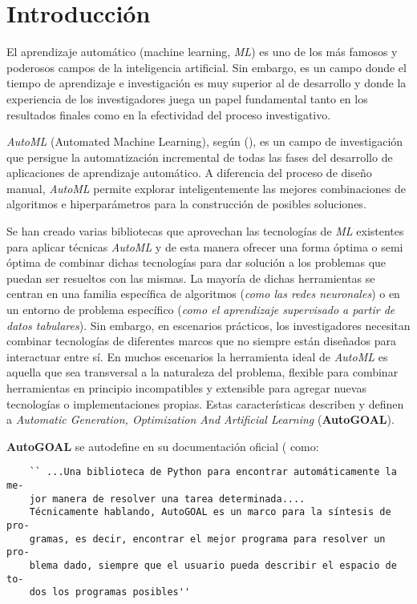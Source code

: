 \chapter*{Introducción}\label{chapter:introduction}


El aprendizaje automático (machine learning, {\it ML}) es uno de los más famosos
y poderosos campos de la inteligencia artificial. Sin embargo, es un campo
donde el tiempo de aprendizaje e investigación es muy superior al de desarrollo
y donde la experiencia de los investigadores juega un papel fundamental tanto
en los resultados finales como en la efectividad del proceso investigativo.

    {\it AutoML} (Automated Machine Learning), según (\cite{autoML}), es un campo de investigación
que persigue la automatización incremental de todas las fases del desarrollo
de aplicaciones de aprendizaje automático. A diferencia del proceso de diseño
manual, {\it AutoML} permite explorar inteligentemente las mejores combinaciones
de algoritmos e hiperparámetros para la construcción de posibles soluciones.

Se han creado varias bibliotecas que aprovechan las tecnologías de {\it ML}
existentes para aplicar técnicas {\it AutoML} y de esta manera ofrecer una forma óptima
o semi óptima de combinar dichas tecnologías para dar solución a
los problemas que puedan ser resueltos con las mismas. La mayoría de dichas
herramientas se centran en una familia específica de algoritmos ({\it como las
        redes neuronales}) o en un entorno de problema específico ({\it como el
        aprendizaje supervisado a partir de datos tabulares}). Sin embargo, en
escenarios prácticos, los investigadores necesitan combinar tecnologías de
diferentes marcos que no siempre están diseñados para interactuar entre sí.
En muchos escenarios la herramienta ideal de {\it AutoML} es aquella que sea
transversal a la naturaleza del problema, flexible para combinar herramientas
en principio incompatibles y extensible para agregar nuevas tecnologías o
implementaciones propias. Estas características describen y definen a
    {\it Automatic Generation, Optimization And Artificial Learning} ({\bf AutoGOAL}).

    {\bf AutoGOAL} se autodefine en su documentación oficial (\cite{autogoal}  como:

\begin{verbatim}
    `` ...Una biblioteca de Python para encontrar automáticamente la me-
    jor manera de resolver una tarea determinada.... 
    Técnicamente hablando, AutoGOAL es un marco para la síntesis de pro-
    gramas, es decir, encontrar el mejor programa para resolver un pro-
    blema dado, siempre que el usuario pueda describir el espacio de to-
    dos los programas posibles''
\end{verbatim}


